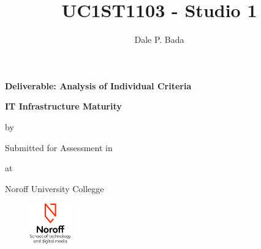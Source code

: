 \begin{titlepage}
  \begin{center}


      {\bfseries{\Huge{Deliverable: Analysis of Individual Criteria}}}

    
      {\bfseries{\LARGE{IT Infrastructure Maturity}}}


      {\Large{by}}

    \begin{author}
      \author{\Large{Dale P. Bada}}
    \end{author}


    \vspace*{2.5cm}
    Submitted for Assessment in


    \begin{title}
        \title{\bfseries{\huge{UC1ST1103 - Studio 1}}}
    \end{title}

    \vspace*{2.5cm}
    at


    \Large{Noroff University Collegge}

    \vfill


    \begin{figure}[h!]
      \centering
      \includegraphics[height=50pt]{Noroff-Logo.png}
    \end{figure}


  \end{center}
\end{titlepage}
